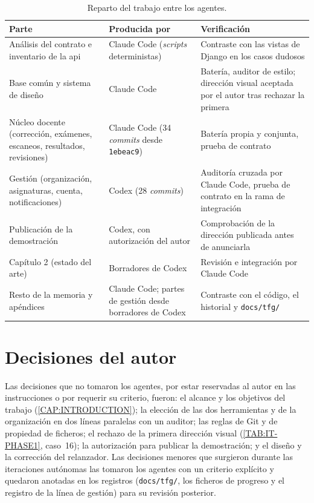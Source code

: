 \begin{table}[htbp]
  \centering
  \small
  \begin{tabular}{p{}p{}p{}}
    \toprule
    \textbf{Parte} & \textbf{Producida por} & \textbf{Verificación} \\
    \midrule
    Análisis del contrato e inventario de la \acs{api} & Claude Code (\textit{scripts}
      deterministas) & Contraste con las vistas de Django en los casos dudosos \\
    Base común y sistema de diseño & Claude Code & Batería, auditor de estilo; dirección
      visual aceptada por el autor tras rechazar la primera \\
    Núcleo docente (corrección, exámenes, escaneos, resultados, revisiones) & Claude Code
      (34 \textit{commits} desde \texttt{1ebeac9}) & Batería propia y conjunta, prueba de
      contrato \\
    Gestión (organización, asignaturas, cuenta, notificaciones) & Codex (28
      \textit{commits}) & Auditoría cruzada por Claude Code, prueba de contrato en la rama
      de integración \\
    Publicación de la demostración & Codex, con autorización del autor & Comprobación de
      la dirección publicada antes de anunciarla \\
    Capítulo 2 (estado del arte) & Borradores de Codex & Revisión e integración por
      Claude Code \\
    Resto de la memoria y apéndices & Claude Code; partes de gestión desde borradores de
      Codex & Contraste con el código, el historial y \texttt{docs/tfg/} \\
    \bottomrule
  \end{tabular}
  \caption{Reparto del trabajo entre los agentes.\label{TAB:AI-SPLIT}}
\end{table}

\section*{Decisiones del autor}

Las decisiones que no tomaron los agentes, por estar reservadas al autor en las
instrucciones o por requerir su criterio, fueron: el alcance y los objetivos del trabajo
(\cref{CAP:INTRODUCTION}); la elección de las dos herramientas y de la organización en dos
líneas paralelas con un auditor; las reglas de Git y de propiedad de ficheros; el rechazo
de la primera dirección visual (\cref{TAB:IT-PHASE1}, caso~16); la autorización para
publicar la demostración; y el diseño y la corrección del relanzador. Las decisiones menores
que surgieron durante las iteraciones autónomas las tomaron los agentes con un criterio
explícito y quedaron anotadas en los registros (\texttt{docs/tfg/}, los ficheros de progreso
y el registro de la línea de gestión) para su revisión posterior.

